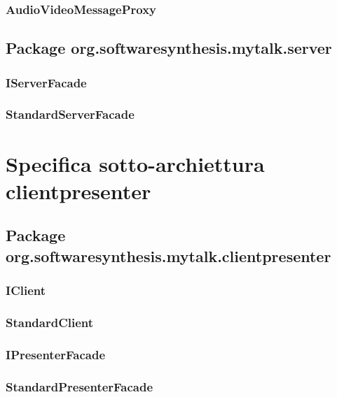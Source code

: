 \subsubsection{AudioVideoMessageProxy}\label{sec:audiovideomessageproxy}

\subsection{Package org.softwaresynthesis.mytalk.server}\label{sec:server}

\subsubsection{IServerFacade}\label{sec:iserverfacade}

\subsubsection{StandardServerFacade}\label{sec:standardserverfacade}

\clearpage

\section{Specifica sotto-archiettura clientpresenter}\label{clientpresenterarchitecture}

\subsection{Package org.softwaresynthesis.mytalk.clientpresenter}\label{sec:clientpresetner}

\subsubsection{IClient}\label{sec:iclient}

\subsubsection{StandardClient}\label{sec:standardclient}

\subsubsection{IPresenterFacade}\label{sec:ipresenterfacade}

\subsubsection{StandardPresenterFacade}\label{sec:standardserverfacade}

